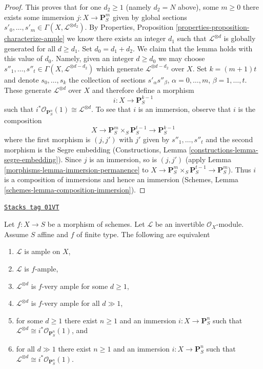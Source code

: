 \begin{proof}
\medskip\noindent
This proves that for one $d_2 \geq 1$
(namely $d_2 = N$ above), some $m \geq 0$ there exists some
immersion $j : X \to \mathbf{P}^m_S$ given by global sections
$s'_0, \ldots, s'_m \in \Gamma(X, \mathcal{L}^{\otimes d_2})$.
By Properties, Proposition \ref{properties-proposition-characterize-ample}
we know there exists an integer
$d_1$ such that $\mathcal{L}^{\otimes d}$ is globally generated
for all $d \geq d_1$. Set $d_0 = d_1 + d_2$. We claim that
the lemma holds with this value of $d_0$. Namely, given
an integer $d \geq d_0$ we may choose $s''_1, \ldots, s''_t
\in \Gamma(X, \mathcal{L}^{\otimes d - d_2})$ which generate
$\mathcal{L}^{\otimes d - d_2}$ over $X$. Set $k = (m + 1)t$ and
denote $s_0, \ldots, s_k$ the collection of sections
$s'_\alpha s''_\beta$, $\alpha = 0, \ldots, m$,
$\beta = 1, \ldots, t$. These generate $\mathcal{L}^{\otimes d}$
over $X$ and therefore define a morphism
$$
i : X \longrightarrow \mathbf{P}^{k - 1}_S
$$
such that $i^*\mathcal{O}_{\mathbf{P}^n_S}(1) \cong \mathcal{L}^{\otimes d}$.
To see that $i$ is an immersion, observe that $i$ is the composition
$$
X \longrightarrow \mathbf{P}^m_S \times_S \mathbf{P}^{t - 1}_S
\longrightarrow \mathbf{P}^{k - 1}_S
$$
where the first morphism is $(j, j')$ with $j'$ given by
$s''_1, \ldots, s''_t$ and the
second morphism is the Segre embedding
(Constructions, Lemma \ref{constructions-lemma-segre-embedding}).
Since $j$ is an immersion, so is $(j, j')$
(apply Lemma \ref{morphisms-lemma-immersion-permanence}
to $X \to \mathbf{P}^m_S \times_S \mathbf{P}^{t - 1}_S
\to \mathbf{P}^m_S$). Thus $i$ is a composition of
immersions and hence an immersion
(Schemes, Lemma \ref{schemes-lemma-composition-immersion}).
\end{proof}

\begin{lemma}
\label{morphisms-lemma-finite-type-over-affine-ample-very-ample}
\href{https://stacks.math.columbia.edu/tag/01VT}{\texttt{Stacks tag 01VT}}

Let $f : X \to S$ be a morphism of schemes.
Let $\mathcal{L}$ be an invertible $\mathcal{O}_X$-module.
Assume $S$ affine and $f$ of finite type.
The following are equivalent
\begin{enumerate}
\item $\mathcal{L}$ is ample on $X$,
\item $\mathcal{L}$ is $f$-ample,
\item $\mathcal{L}^{\otimes d}$ is $f$-very ample for some $d \geq 1$,
\item $\mathcal{L}^{\otimes d}$ is $f$-very ample for all $d \gg 1$,
\item for some $d \geq 1$ there exist $n \geq 1$ and an immersion
$i : X \to \mathbf{P}^n_S$ such that
$\mathcal{L}^{\otimes d} \cong i^*\mathcal{O}_{\mathbf{P}^n_S}(1)$, and
\item for all $d \gg 1$ there exist $n \geq 1$ and an immersion
$i : X \to \mathbf{P}^n_S$ such that
$\mathcal{L}^{\otimes d} \cong i^*\mathcal{O}_{\mathbf{P}^n_S}(1)$.
\end{enumerate}
\end{lemma}

